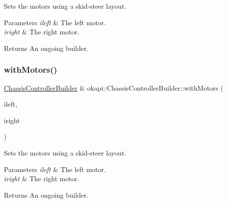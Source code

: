 Sets the motors using a skid-\/steer layout.


\begin{DoxyParams}{Parameters}
{\em ileft} & The left motor. \\
\hline
{\em iright} & The right motor. \\
\hline
\end{DoxyParams}
\begin{DoxyReturn}{Returns}
An ongoing builder. 
\end{DoxyReturn}
\mbox{\label{classokapi_1_1ChassisControllerBuilder_a98b304ce096222c0f3af8105ab61ee71}} 
\subsubsection{\texorpdfstring{withMotors()}{withMotors()}\hspace{0.1cm}{\footnotesize\ttfamily [2/6]}}
{\footnotesize\ttfamily \mbox{\hyperlink{classokapi_1_1ChassisControllerBuilder}{Chassis\+Controller\+Builder}} \& okapi\+::\+Chassis\+Controller\+Builder\+::with\+Motors (\begin{DoxyParamCaption}\item[{const \mbox{\hyperlink{classokapi_1_1MotorGroup}{Motor\+Group}} \&}]{ileft,  }\item[{const \mbox{\hyperlink{classokapi_1_1MotorGroup}{Motor\+Group}} \&}]{iright }\end{DoxyParamCaption})}

Sets the motors using a skid-\/steer layout.


\begin{DoxyParams}{Parameters}
{\em ileft} & The left motor. \\
\hline
{\em iright} & The right motor. \\
\hline
\end{DoxyParams}
\begin{DoxyReturn}{Returns}
An ongoing builder. 
\end{DoxyReturn}
\mbox{\label{classokapi_1_1ChassisControllerBuilder_a4482565290d9433bff4dc6c48543e334}} 

